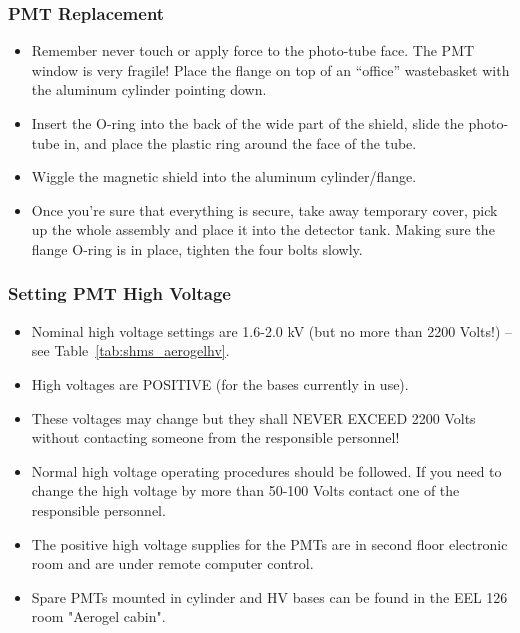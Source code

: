 {\subsubsection*{PMT Replacement}

\begin{itemize}
\item Remember never touch or apply force to the photo-tube face. The
  PMT window is very fragile!  Place the flange on top of an
  ``office'' wastebasket with the aluminum cylinder pointing down.
\item Insert the O-ring into the  back of the wide part of the
  shield, slide the photo-tube in, and  place the plastic ring around
  the face of the tube.
\item Wiggle the  magnetic shield into the
  aluminum cylinder/flange.
\item Once you're sure  that everything is
  secure, take away temporary cover, pick up the  whole assembly and
  place it into the detector tank. Making sure the  flange O-ring is
  in place, tighten the four bolts slowly.
\end{itemize}

\subsubsection{Setting PMT High Voltage}
\begin{itemize}
\item Nominal high voltage settings are  1.6-2.0 kV (but no more
  than 2200 Volts!) – see Table~\ref{tab:shms_aerogelhv}.
\item High  voltages are POSITIVE (for
  the bases currently in use).
\item These  voltages may change but they
  shall NEVER EXCEED 2200 Volts without  contacting someone from the
  responsible personnel!
\item Normal high voltage operating
  procedures should be followed. If you need to  change the high
  voltage by more than 50-100 Volts contact one of the  responsible
  personnel.
\item The positive high voltage supplies for the  PMTs are in
  second floor electronic room and are under remote computer control.
\cite{howto:CAEN_HV_operation}
\item Spare
  PMTs mounted in cylinder and HV bases can be found in the EEL 126
  room "Aerogel cabin".
\end{itemize}

}
